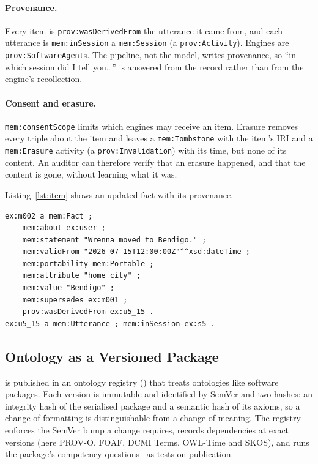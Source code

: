 \paragraph{Provenance.} Every item is \texttt{prov:wasDerivedFrom} the utterance it came from,
and each utterance is \texttt{mem:inSession} a \texttt{mem:Session} (a \texttt{prov:Activity}).
Engines are \texttt{prov:SoftwareAgent}s. The pipeline, not the model, writes provenance, so
``in which session did I tell you\dots'' is answered from the record rather than from the
engine's recollection.

\paragraph{Consent and erasure.} \texttt{mem:consentScope} limits which engines may receive an
item. Erasure removes every triple about the item and leaves a \texttt{mem:Tombstone} with the
item's IRI and a \texttt{mem:Erasure} activity (a \texttt{prov:Invalidation}) with its time, but
none of its content. An auditor can therefore verify that an erasure happened, and that the
content is gone, without learning what it was.

Listing~\ref{lst:item} shows an updated fact with its provenance.

\begin{lstlisting}[basicstyle=\ttfamily\scriptsize,frame=single,float=t,
  caption={A fact that supersedes an earlier one (prefixes omitted), from the gold store of evaluation persona e01.},label={lst:item}]
ex:m002 a mem:Fact ;
    mem:about ex:user ;
    mem:statement "Wrenna moved to Bendigo." ;
    mem:validFrom "2026-07-15T12:00:00Z"^^xsd:dateTime ;
    mem:portability mem:Portable ;
    mem:attribute "home city" ;
    mem:value "Bendigo" ;
    mem:supersedes ex:m001 ;
    prov:wasDerivedFrom ex:u5_15 .
ex:u5_15 a mem:Utterance ; mem:inSession ex:s5 .
\end{lstlisting}

\subsection{Ontology as a Versioned Package}\label{sec:registry}

\memcore is published in an ontology registry (\registry) that treats ontologies like software
packages. Each version is immutable and identified by SemVer and two hashes: an integrity hash of
the serialised package and a semantic hash of its axioms, so a change of formatting is
distinguishable from a change of meaning. The registry enforces the SemVer bump a change
requires, records dependencies at exact versions (here PROV-O, FOAF, DCMI Terms, OWL-Time and
SKOS), and runs the package's competency questions~\cite{gruninger1995} as tests on publication.

